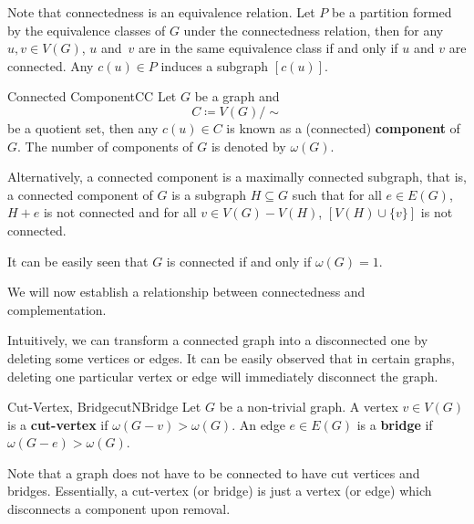 \documentclass[math]{amznotes}
\makeatletter
\let\save@mathaccent\mathaccent
\newcommand*\if@single[3]{%
  \setbox0\hbox{${\mathaccent"0362{#1}}^H$}%
  \setbox2\hbox{${\mathaccent"0362{\kern0pt#1}}^H$}%
  \ifdim\ht0=\ht2 #3\else #2\fi
  }
\newcommand*\rel@kern[1]{\kern#1\dimexpr\macc@kerna}
\newcommand*\widebar[1]{\@ifnextchar^{{\wide@bar{#1}{0}}}{\wide@bar{#1}{1}}}
\newcommand*\wide@bar[2]{\if@single{#1}{\wide@bar@{#1}{#2}{1}}{\wide@bar@{#1}{#2}{2}}}
\newcommand*\wide@bar@[3]{%
  \begingroup
  \def\mathaccent##1##2{%
    \let\mathaccent\save@mathaccent
    \if#32 \let\macc@nucleus\first@char \fi
    \setbox\z@\hbox{$\macc@style{\macc@nucleus}_{}$}%
    \setbox\tw@\hbox{$\macc@style{\macc@nucleus}{}_{}$}%
    \dimen@\wd\tw@
    \advance\dimen@-\wd\z@
    \divide\dimen@ 3
    \@tempdima\wd\tw@
    \advance\@tempdima-\scriptspace
    \divide\@tempdima 10
    \advance\dimen@-\@tempdima
    \ifdim\dimen@>\z@ \dimen@0pt\fi
    \rel@kern{0.6}\kern-\dimen@
    \if#31
      \overline{\rel@kern{-0.6}\kern\dimen@\macc@nucleus\rel@kern{0.4}\kern\dimen@}%
      \advance\dimen@0.4\dimexpr\macc@kerna
      \let\final@kern#2%
      \ifdim\dimen@<\z@ \let\final@kern1\fi
      \if\final@kern1 \kern-\dimen@\fi
    \else
      \overline{\rel@kern{-0.6}\kern\dimen@#1}%
    \fi
  }%
  \macc@depth\@ne
  \let\math@bgroup\@empty \let\math@egroup\macc@set@skewchar
  \mathsurround\z@ \frozen@everymath{\mathgroup\macc@group\relax}%
  \macc@set@skewchar\relax
  \let\mathaccentV\macc@nested@a
  \if#31
    \macc@nested@a\relax111{#1}%
  \else
    \def\gobble@till@marker##1\endmarker{}%
    \futurelet\first@char\gobble@till@marker#1\endmarker
    \ifcat\noexpand\first@char A\else
      \def\first@char{}%
    \fi
    \macc@nested@a\relax111{\first@char}%
  \fi
  \endgroup
}
\theoremstyle{remark}
\makeatother
\begin{document}
Note that connectedness is an equivalence relation. Let $P$ be a partition formed by the equivalence classes of $G$ under the connectedness relation, then for any $u, v \in V(G)$, $u$ and~$v$ are in the same equivalence class if and only if $u$ and $v$ are connected. Any $c(u) \in P$ induces a subgraph $[c(u)]$.
\begin{dfnbox}{Connected Component}{CC}
    Let $G$ be a graph and 
    \begin{equation*}
        C \coloneqq V(G) \slash \sim
    \end{equation*}
    be a quotient set, then any $c(u) \in C$ is known as a (connected) {\color{red} \textbf{component}} of $G$. The number of components of $G$ is denoted by $\omega(G)$.
\end{dfnbox}
Alternatively, a connected component is a maximally connected subgraph, that is, a connected component of $G$ is a subgraph $H \subseteq G$ such that for all $e \in E(G)$, $H + e$ is not connected and for all $v \in V(G) - V(H)$, $\left[V(H) \cup \{v\}\right]$ is not connected.

It can be easily seen that $G$ is connected if and only if $\omega(G) = 1$.

We will now establish a relationship between connectedness and complementation.
Intuitively, we can transform a connected graph into a disconnected one by deleting some vertices or edges. It can be easily observed that in certain graphs, deleting one particular vertex or edge will immediately disconnect the graph.
\begin{dfnbox}{Cut-Vertex, Bridge}{cutNBridge}
    Let $G$ be a non-trivial graph. A vertex $v \in V(G)$ is a {\color{red} \textbf{cut-vertex}} if $\omega(G - v) > \omega(G)$. An edge $e \in E(G)$ is a {\color{red} \textbf{bridge}} if $\omega(G - e) > \omega(G)$.
\end{dfnbox}
Note that a graph does not have to be connected to have cut vertices and bridges. Essentially, a cut-vertex (or bridge) is just a vertex (or edge) which disconnects a component upon removal.
\end{document}
